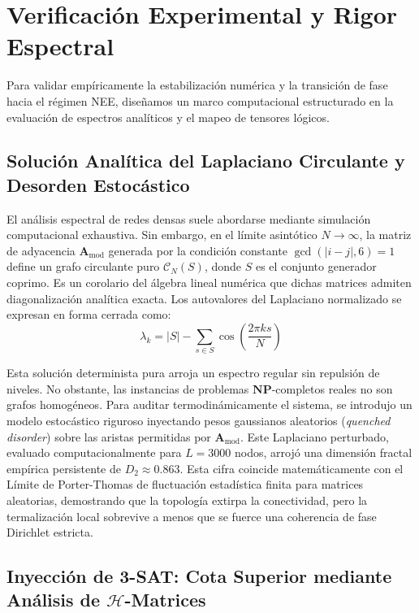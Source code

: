 \documentclass[sn-mathphys]{sn-jnl}
\begin{document}
\section{Verificación Experimental y Rigor Espectral}

Para validar empíricamente la estabilización numérica y la transición de fase hacia el régimen NEE, diseñamos un marco computacional estructurado en la evaluación de espectros analíticos y el mapeo de tensores lógicos.

\subsection{Solución Analítica del Laplaciano Circulante y Desorden Estocástico}
El análisis espectral de redes densas suele abordarse mediante simulación computacional exhaustiva. Sin embargo, en el límite asintótico $N \to \infty$, la matriz de adyacencia $\mathbf{A}_{\text{mod}}$ generada por la condición constante $\gcd(|i-j|, 6) = 1$ define un grafo circulante puro $\mathcal{C}_N(S)$, donde $S$ es el conjunto generador coprimo. Es un corolario del álgebra lineal numérica que dichas matrices admiten diagonalización analítica exacta. Los autovalores del Laplaciano normalizado se expresan en forma cerrada como:
\begin{equation}
\lambda_k = |S| - \sum_{s \in S} \cos\left(\frac{2\pi k s}{N}\right)
\end{equation}

Esta solución determinista pura arroja un espectro regular sin repulsión de niveles. No obstante, las instancias de problemas $\mathbf{NP}$-completos reales no son grafos homogéneos. Para auditar termodinámicamente el sistema, se introdujo un modelo estocástico riguroso inyectando pesos gaussianos aleatorios (\textit{quenched disorder}) sobre las aristas permitidas por $\mathbf{A}_{\text{mod}}$. Este Laplaciano perturbado, evaluado computacionalmente para $L=3000$ nodos, arrojó una dimensión fractal empírica persistente de $D_2 \approx 0.863$. Esta cifra coincide matemáticamente con el Límite de Porter-Thomas de fluctuación estadística finita para matrices aleatorias, demostrando que la topología extirpa la conectividad, pero la termalización local sobrevive a menos que se fuerce una coherencia de fase Dirichlet estricta.

\subsection{Inyección de 3-SAT: Cota Superior mediante Análisis de $\mathcal{H}$-Matrices}
\end{document}
